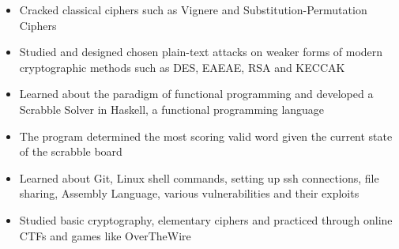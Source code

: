 \documentclass[10pt,a4paper,ragged2e]{altacv}
\begin{document}
\begin{itemize}
\item Cracked classical ciphers such as Vignere and Substitution-Permutation Ciphers
\item Studied and designed chosen plain-text attacks on weaker forms of modern cryptographic methods such as DES, EAEAE, RSA and KECCAK
\end{itemize}
\smallskip
\smallskip
{}
\begin{itemize}
\item Learned about the paradigm of functional programming and developed a Scrabble Solver in Haskell, a functional programming language
\item The program determined the most scoring valid word given the current state of the scrabble board
\end{itemize}
\smallskip
\smallskip
{}
\begin{itemize}
\item Learned about Git, Linux shell commands, setting up ssh connections, file sharing, Assembly Language, various vulnerabilities and their exploits
\item Studied basic cryptography, elementary ciphers and practiced through online CTFs and games like OverTheWire
\end{itemize}



\clearpage


\nocite{*}




\end{document}
